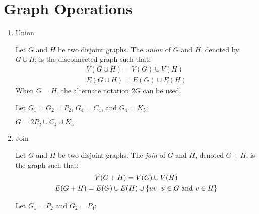 \documentclass[letterpaper,12pt,fleqn]{article}
\begin{document}
\section*{Graph Operations}

\begin{enumerate}[left=0pt]
\item Union

  \begin{definition}[Union]
    Let \(G\) and \(H\) be two disjoint graphs.  The \emph{union} of \(G\) and \(H\), denoted by \(G\cup H\), is
    the disconnected graph such that:
    \begin{gather*}
      V(G\cup H)=V(G)\cup V(H) \\
      E(G\cup H)=E(G)\cup E(H)
    \end{gather*}
    When \(G=H\), the alternate notation \(2G\) can be used.
  \end{definition}

  \begin{example}
    Let \(G_1=G_2=P_2\), \(G_4=C_4\), and \(G_4=K_5\):

    \bigskip

    \begin{center}

      \(G=2P_2\cup C_4\cup K_5\)
    \end{center}
  \end{example}

\item Join

  \begin{definition}[Join]
    Let \(G\) and \(H\) be two disjoint graphs.  The \emph{join} of \(G\) and \(H\), denoted \(G+H\), is the
    graph such that:
    \begin{gather*}
      V(G+H)=V(G)\cup V(H) \\
      E(G+H)=E(G)\cup E(H)\cup\left\{{uv}\,\middle|\,{u\in G\ \text{and}\ v\in H}\right\}
    \end{gather*}
  \end{definition}

  \begin{example}
    Let \(G_1=P_2\) and \(G_2=P_4\):
    \begin{center}


\end{center}
\end{example}
\end{enumerate}
\end{document}
